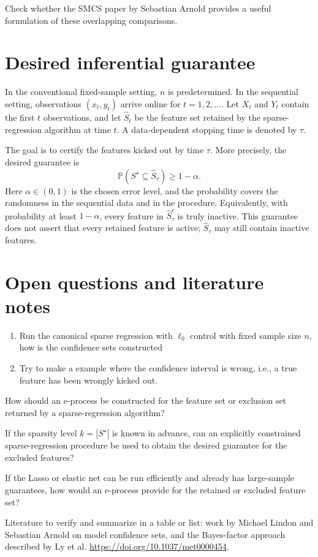 \documentclass{wyqart}
\newcommand{\yq}[1]{{\color{red} #1}}
\begin{document}
\yq{Check whether the SMCS paper by Sebastian Arnold provides a useful
formulation of these overlapping comparisons.}

\section{Desired inferential guarantee}

In the conventional fixed-sample setting, $n$ is predetermined.
In the sequential setting, observations $(x_t,y_t)$ arrive online for
$t=1,2,\ldots$.
Let $X_t$ and $Y_t$ contain the first $t$ observations,
and let $\widehat{S}_t$ be the feature set retained by the sparse-regression
algorithm at time $t$.
A data-dependent stopping time is denoted by $\tau$.

The goal is to certify the features kicked out by time $\tau$.
More precisely, the desired guarantee is
$$
	\mathbb{P}\left(S^\star\subseteq\widehat{S}_\tau\right)
	\geq 1-\alpha.
$$
Here $\alpha\in(0,1)$ is the chosen error level,
and the probability covers the randomness in the sequential data and in the
procedure.
Equivalently, with probability at least $1-\alpha$,
every feature in $\widehat{S}_\tau^c$ is truly inactive.
This guarantee does not assert that every retained feature is active;
$\widehat{S}_\tau$ may still contain inactive features.

\section{Open questions and literature notes}

\begin{enumerate}
	\item Run the canonical sparse regression with $\ell_0$ control with fixed sample size $n$, how is the confidence sets constructed
	\item Try to make a example where the confidence interval is wrong, i.e., a true feature has been wrongly kicked out.
\end{enumerate}

\yq{How should an e-process be constructed for the feature set or exclusion
set returned by a sparse-regression algorithm?}

\yq{If the sparsity level $k=|S^\star|$ is known in advance,
can an explicitly constrained sparse-regression procedure be used to obtain
the desired guarantee for the excluded features?}

\yq{If the Lasso or elastic net can be run efficiently and already has
large-sample guarantees, how would an e-process
provide for the retained or excluded feature set?}

\yq{Literature to verify and summarize in a table or list:
work by Michael Lindon and Sebastian Arnold on model confidence sets,
and the Bayes-factor approach described by Ly et al.
\url{https://doi.org/10.1037/met0000454}.}
\end{document}
